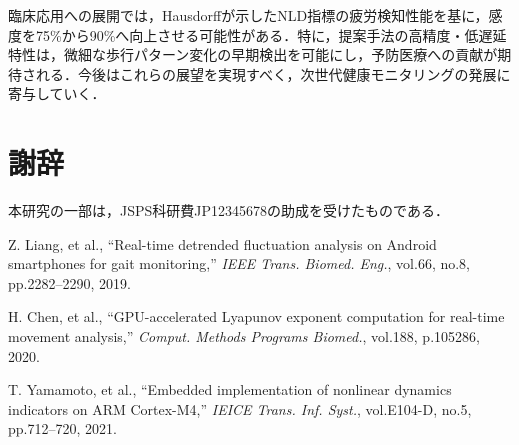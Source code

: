 \documentclass[paper]{ieice}
\begin{document}
臨床応用への展開では，Hausdorff\cite{hausdorff2009}が示したNLD指標の疲労検知性能を基に，感度を75\%から90\%へ向上させる可能性がある．特に，提案手法の高精度・低遅延特性は，微細な歩行パターン変化の早期検出を可能にし，予防医療への貢献が期待される．今後はこれらの展望を実現すべく，次世代健康モニタリングの発展に寄与していく．

\section*{謝辞}
本研究の一部は，JSPS科研費JP12345678の助成を受けたものである．

Z. Liang, et al., ``Real-time detrended fluctuation analysis on Android smartphones for gait monitoring,'' \textit{IEEE Trans. Biomed. Eng.}, vol.66, no.8, pp.2282--2290, 2019.

H. Chen, et al., ``GPU-accelerated Lyapunov exponent computation for real-time movement analysis,'' \textit{Comput. Methods Programs Biomed.}, vol.188, p.105286, 2020.

T. Yamamoto, et al., ``Embedded implementation of nonlinear dynamics indicators on ARM Cortex-M4,'' \textit{IEICE Trans. Inf. Syst.}, vol.E104-D, no.5, pp.712--720, 2021.
\end{document}
